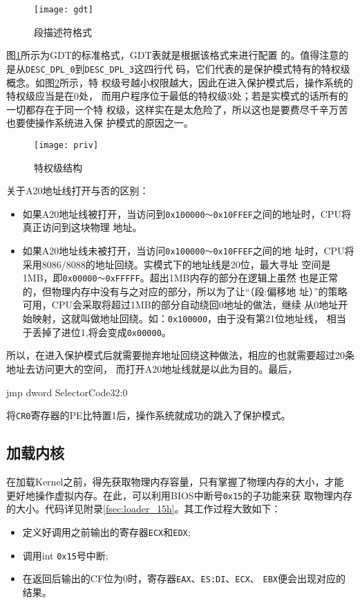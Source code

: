 \begin{figure}
  \centering
  \texttt{[image: gdt]}
  \caption{段描述符格式}
  \label{fig:gdt}
\end{figure}

图\ref{fig:gdt}所示为GDT的标准格式，GDT表就是根据该格式来进行配置
的。值得注意的是从\texttt{DESC\_DPL\_0}到\texttt{DESC\_DPL\_3}这四行代
码，它们代表的是保护模式特有的特权级概念。如图\ref{fig:tequan}所示，特
权级号越小权限越大，因此在进入保护模式后，操作系统的特权级应当是在0处，
而用户程序位于最低的特权级3处；若是实模式的话所有的一切都存在于同一个特
权级，这样实在是太危险了，所以这也是要费尽千辛万苦也要使操作系统进入保
护模式的原因之一。

\begin{figure}[H]
  \centering
  \texttt{[image: priv]}
  \caption{特权级结构}
  \label{fig:tequan}
\end{figure}

关于A20地址线打开与否的区别：
\begin{itemize}
\item 如果A20地址线被打开，当访问到\texttt{0x100000～0x10FFEF}之间的地址时，CPU将真正访问到这块物理
  地址。
\item 如果A20地址线未被打开，当访问\texttt{0x100000～0x10FFEF}之间的地
  址时，CPU将采用8086/8088的地址回绕。实模式下的地址线是20位，最大寻址
  空间是1MB，即\texttt{0x00000～0xFFFFF}。超出1MB内存的部分在逻辑上虽然
  也是正常的，但物理内存中没有与之对应的部分，所以为了让“（段:偏移地
  址）”的策略可用，CPU会采取将超过1MB的部分自动绕回0地址的做法，继续
  从0地址开始映射，这就叫做地址回绕。如：\texttt{0x100000}，由于没有第21位地址线，
  相当于丢掉了进位1,将会变成\texttt{0x00000}。
\end{itemize}

所以，在进入保护模式后就需要抛弃地址回绕这种做法，相应的也就需要超过20条地址去访问更大的空间，
而打开A20地址线就是以此为目的。最后，
\begin{codeblock}
  \begin{nasmcode}
    jmp dword SelectorCode32:0
  \end{nasmcode}
\end{codeblock}
将\texttt{CR0}寄存器的PE比特置1后，操作系统就成功的跳入了保护模式。

\subsection{加载内核}
\label{subsec:kernel}

在加载Kernel之前，得先获取物理内存容量，只有掌握了物理内存的大小，才能
更好地操作虚拟内存。在此，可以利用BIOS中断号\texttt{0x15}的子功能来获
取物理内存的大小。代码详见附录\ref{fsec:loader_15h}。其工作过程大致如下：
\begin{itemize}
\item 定义好调用之前输出的寄存器\texttt{ECX}和\texttt{EDX};
\item 调用int \texttt{0x15}号中断;
\item 在返回后输出的CF位为0时，寄存器\texttt{EAX}、\texttt{ES:DI}、\texttt{ECX}、
  \texttt{EBX}便会出现对应的结果。
\end{itemize}

